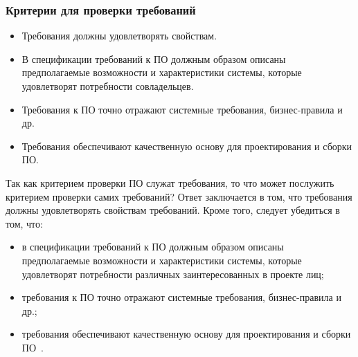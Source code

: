 \documentclass{../industrial-development}
\begin{document}
{\begin{frame} \frametitle {Критерии для проверки
требований}
\begin{itemize}
\item Требования должны удовлетворять свойствам.
\item В спецификации требований к ПО должным образом описаны предполагаемые возможности и характеристики системы, которые удовлетворят потребности совладельцев.
\item Требования к ПО точно отражают системные требования, бизнес-правила и др.
\item Требования обеспечивают качественную основу для проектирования и сборки ПО.
\end{itemize}
\end{frame}

\lecturenotes

Так как критерием проверки ПО служат требования, то что может послужить критерием проверки самих требований? Ответ заключается в том, что требования должны удовлетворять свойствам требований. Кроме того, следует убедиться в том, что:
\begin{itemize}
\item в спецификации требований к ПО должным образом описаны предполагаемые возможности и характеристики системы, которые удовлетворят потребности различных заинтересованных в проекте лиц;
\item требования к ПО точно отражают системные требования, бизнес-правила и др.;
\item требования обеспечивают качественную основу для проектирования и сборки ПО~\cite[с.~64]{Maglinec}.
\end{itemize}


}
\end{document}
